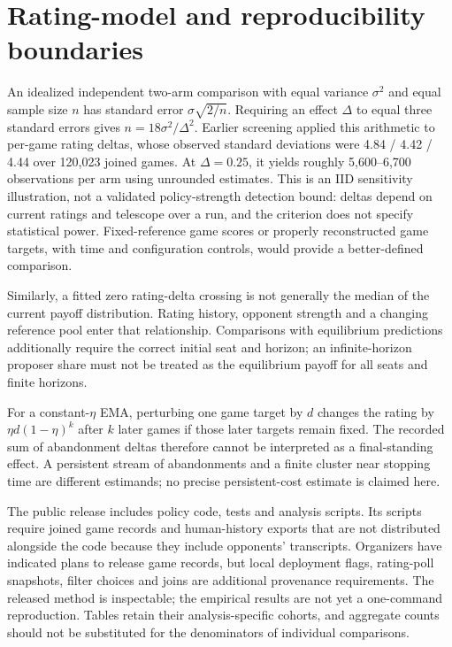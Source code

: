 \documentclass{article}
\begin{document}
\section{Rating-model and reproducibility boundaries}
\label{app:measurement}
An idealized independent two-arm comparison with equal variance $\sigma^2$
and equal sample size $n$ has standard error $\sigma\sqrt{2/n}$. Requiring an
effect $\Delta$ to equal three standard errors gives
$n=18\sigma^2/\Delta^2$. Earlier screening applied this arithmetic to
per-game rating deltas, whose observed standard deviations were
4.84 / 4.42 / 4.44 over 120,023 joined games. At $\Delta=0.25$, it yields
roughly 5,600--6,700 observations per arm using unrounded estimates. This is
an IID sensitivity illustration, not a validated policy-strength detection
bound: deltas depend on current ratings and telescope over a run, and the
criterion does not specify statistical power. Fixed-reference game scores or
properly reconstructed game targets, with time and configuration controls,
would provide a better-defined comparison.

Similarly, a fitted zero rating-delta crossing is not generally the median of
the current payoff distribution. Rating history, opponent strength and a
changing reference pool enter that relationship. Comparisons with equilibrium
predictions additionally require the correct initial seat and horizon; an
infinite-horizon proposer share must not be treated as the equilibrium payoff
for all seats and finite horizons.

For a constant-$\eta$ EMA, perturbing one game target by $d$ changes the rating
by $\eta d(1-\eta)^k$ after $k$ later games if those later targets remain fixed.
The recorded sum of abandonment deltas therefore cannot be interpreted as a
final-standing effect. A persistent stream of abandonments and a finite cluster
near stopping time are different estimands; no precise persistent-cost estimate
is claimed here.

The public release includes policy code, tests and analysis scripts. Its scripts
require joined game records and human-history exports that are not distributed
alongside the code because they include opponents' transcripts. Organizers have
indicated plans to release game records, but local deployment flags, rating-poll
snapshots, filter choices and joins are additional provenance requirements.
The released method is inspectable; the empirical results are not yet a
one-command reproduction. Tables retain their analysis-specific cohorts, and
aggregate counts should not be substituted for the denominators of individual
comparisons.
\end{document}
